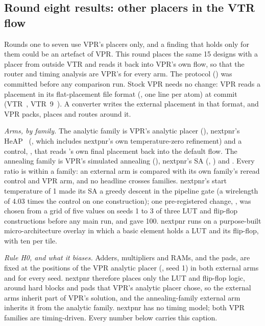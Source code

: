 \subsection{Round eight results: other placers in the VTR flow}
\label{sec:r8-results}


Rounds one to seven use VPR's placers only, and a finding that holds only for them could be an artefact of VPR. This
round places the same 15 designs with a placer from outside VTR and reads it back into VPR's own flow, so that the
router and timing analysis are VPR's for every arm. The protocol () was committed before any
comparison run. Stock VPR needs no change: VPR reads a placement in its flat-placement file format
(, one line per atom) at commit  (VTR~\cite{rose2012vtr}, VTR~9~\cite{elgammal2025vtr9}).
A converter writes the external placement in that format, and VPR packs, places and routes around it.

\emph{Arms, by family.} The analytic family is VPR's analytic placer (), nextpnr's HeAP~\cite{gort2012heap,shah2019nextpnr}
(, which includes nextpnr's own temperature-zero refinement) and a control, , that
reads 's own final placement back into the default flow. The annealing family is VPR's simulated annealing
(), nextpnr's SA (, ) and . Every
ratio is within a family: an external arm is compared with its own family's reread control and VPR arm, and no headline
crosses families. nextpnr's start temperature of 1 made its SA a greedy descent in the pipeline gate (a wirelength of 4.03
times the control on one construction); one pre-registered change, , was chosen from a grid of five values on seeds 1 to 3 of three LUT and flip-flop
constructions before any main run, and gave 100. nextpnr runs on a purpose-built  micro-architecture overlay
in which a basic element holds a LUT and its flip-flop, with ten per tile.

\emph{Rule H0, and what it biases.} Adders, multipliers and RAMs, and the pads, are fixed at the positions of the VPR analytic
placer (, seed 1) in both external arms and for every seed. nextpnr therefore places only the LUT and flip-flop logic, around
hard blocks and pads that VPR's analytic placer chose, so the external arms inherit part of VPR's solution, and the
annealing-family external arm inherits it from the analytic family. nextpnr has no timing model; both VPR families are
timing-driven. Every number below carries this caption.


